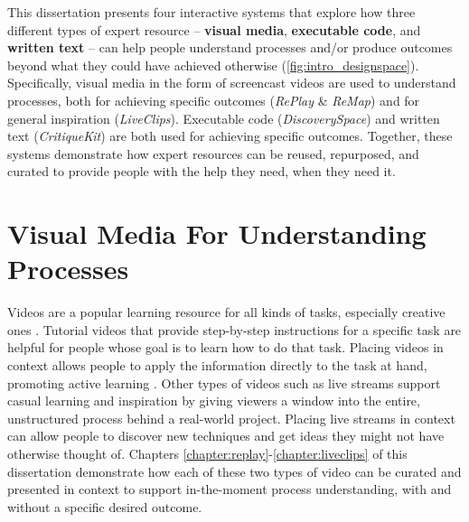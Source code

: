 This dissertation presents four interactive systems that explore how three different types of expert resource -- \textbf{visual media}, \textbf{executable code}, and \textbf{written text} -- can help people 
understand processes and/or produce outcomes beyond what they could have achieved otherwise (\autoref{fig:intro_designspace}). Specifically, visual media in the form of screencast videos are used to understand processes, both for achieving specific outcomes (\textit{RePlay} \& \textit{ReMap}) and for general inspiration (\textit{LiveClips}). Executable code (\textit{DiscoverySpace}) and written text (\textit{CritiqueKit}) are both used for achieving specific outcomes. Together, these systems demonstrate how expert resources can be reused, repurposed, and curated to provide people with the help they need, when they need it.


\section{Visual Media For Understanding Processes}
Videos are a popular learning resource for all kinds of tasks, especially creative ones \cite{Chi2012, Nguyen2015, Pongnumkul2011}. Tutorial videos that provide step-by-step instructions for a specific task are helpful for people whose goal is to learn how to do that task. Placing videos in context allows people to apply the information directly to the task at hand, promoting active learning \cite{Bonwell1991}. Other types of videos such as live streams support casual learning and inspiration by giving viewers a window into the entire, unstructured process behind a real-world project. Placing live streams in context can allow people to discover new techniques and get ideas they might not have otherwise thought of. Chapters \ref{chapter:replay}-\ref{chapter:liveclips} of this dissertation demonstrate how each of these two types of video can be curated and presented in context to support in-the-moment process understanding, with and without a specific desired outcome.

